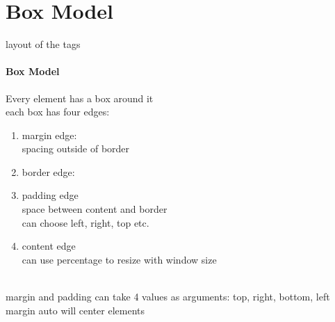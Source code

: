 \documentclass{article}
\begin{document}
\section{Box Model}
	layout of the tags
	\paragraph*{Box Model} Every element has a box around it
	\\each box has four edges:
	\begin{enumerate}
		\itemsep0em
		\item margin edge:
		\\ spacing outside of border
		\item border edge:
		\\
		\item padding edge
		\\ space between content and border
		\\ can choose left, right, top etc.
		\item content edge
		\\ can use percentage to resize with window size
	\end{enumerate}
	\\margin and padding can take 4 values as arguments: top, right, bottom, left
	\\margin auto will center elements
\end{document}
